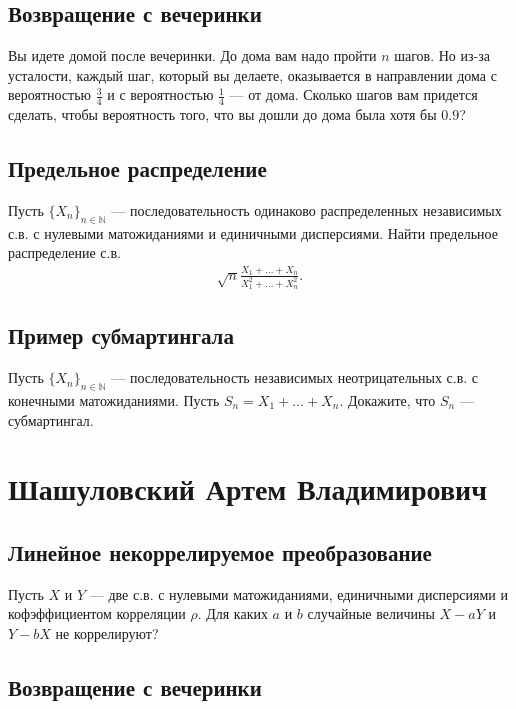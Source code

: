 \documentclass[12pt]{article}
\newcommand\N{\mathbb{N}}
\begin{document}
\subsection{Возвращение с вечеринки}

Вы идете домой после вечеринки. До дома вам надо пройти $n$ шагов. Но из-за усталости, каждый шаг, который вы делаете, оказывается в направлении дома с вероятностью $\frac{3}{4}$ и с вероятностью $\frac{1}{4}$ --- от дома. Сколько шагов вам придется сделать, чтобы вероятность того, что вы дошли до дома была хотя бы $0.9$?

\subsection{Предельное распределение}

Пусть $\{X_n\}_{n \in \N}$ --- последовательность одинаково распределенных независимых с.в. с нулевыми матожиданиями и единичными дисперсиями. Найти предельное распределение с.в.
\begin{align*}
    \sqrt{n}\frac{X_1 + \dots + X_n}{X_1^2 + \dots + X_n^2}.
\end{align*}

\subsection{Пример субмартингала}

Пусть $\{X_n\}_{n \in \N}$ --- последовательность независимых неотрицательных с.в. с конечными матожиданиями. Пусть $S_n = X_1 + \dots + X_n$. Докажите, что $S_n$ --- субмартингал.

\newpage
\section{Шашуловский Артем Владимирович}

\subsection{Линейное некоррелируемое преобразование}

Пусть $X$ и $Y$ --- две с.в. с нулевыми матожиданиями, единичными дисперсиями и кофэффициентом корреляции $\rho$. Для каких $a$ и $b$ случайные величины $X - aY$ и $Y - bX$ не коррелируют?


\subsection{Возвращение с вечеринки}
\end{document}
